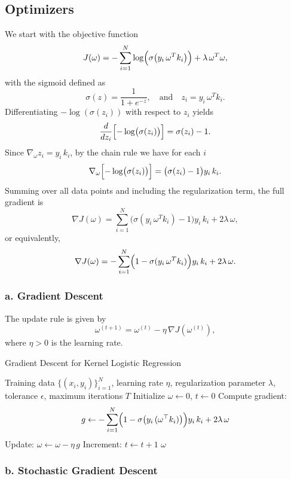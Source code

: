 \documentclass{article}
\begin{document}
\subsection*{Optimizers}

We start with the objective function
\[
J(\omega) = -\sum_{i=1}^{N} \log\Bigl(\sigma\bigl(y_i\,\omega^T k_i\bigr)\Bigr) + \lambda\,\omega^T\omega,
\]
with the sigmoid defined as
\[
\sigma(z)=\frac{1}{1+e^{-z}}, \quad \text{and} \quad z_i = y_i\,\omega^T k_i.
\]
Differentiating \(-\log(\sigma(z_i))\) with respect to \(z_i\) yields
\[
\frac{d}{dz_i}\Bigl[-\log\bigl(\sigma(z_i)\bigr)\Bigr] = \sigma(z_i)-1.
\]
Since \(\nabla_\omega z_i = y_i\,k_i\), by the chain rule we have for each \(i\)
\[
\nabla_\omega\Bigl[-\log\bigl(\sigma(z_i)\bigr)\Bigr] = \bigl(\sigma(z_i)-1\bigr)y_i\,k_i.
\]
Summing over all data points and including the regularization term, the full gradient is
\[
\nabla J(\omega) = \sum_{i=1}^{N} \bigl(\sigma(y_i\,\omega^T k_i)-1\bigr)y_i\,k_i + 2\lambda\,\omega,
\]
or equivalently,
\[
\nabla J(\omega) = -\sum_{i=1}^{N} \Bigl(1-\sigma(y_i\,\omega^T k_i)\Bigr)y_i\,k_i + 2\lambda\,\omega.
\]

\subsubsection*{a. Gradient Descent}

The update rule is given by
\[
\omega^{(t+1)} = \omega^{(t)} - \eta\, \nabla J(\omega^{(t)}),
\]
where \(\eta > 0\) is the learning rate.

\begin{algorithm}
  \caption{Gradient Descent for Kernel Logistic Regression}
  \begin{algorithmic}[1]
  \Require Training data $\{(x_i, y_i)\}_{i=1}^{N}$, learning rate $\eta$, regularization parameter $\lambda$, tolerance $\epsilon$, maximum iterations $T$
  \State Initialize $\omega \gets 0$, $t \gets 0$
  \Repeat
      \State Compute gradient:
      \[
        g \gets -\sum_{i=1}^{N}\Bigl(1-\sigma\bigl(y_i\,(\omega^\top k_i)\bigr)\Bigr)y_i\,k_i + 2\lambda\,\omega
      \]
      \State Update: $\omega \gets \omega - \eta\, g$
      \State Increment: $t \gets t+1$
  \State \Return $\omega$
  \end{algorithmic}
\end{algorithm}

\subsubsection*{b. Stochastic Gradient Descent}
\end{document}
